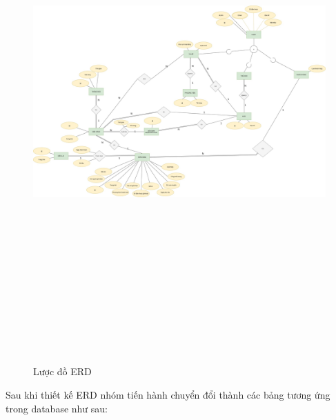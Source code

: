 		\begin{figure}[H]
			\includegraphics[angle=90, width=15cm, height=20cm]{Images/ERD.jpg}
			\centering
			\linebreak
			\caption{Lược đồ ERD}
		\end{figure}
	
	\newpage
	
	\newpage
	
	Sau khi thiết kế ERD nhóm tiến hành chuyển đổi thành các bảng tương ứng trong database như sau:
	
